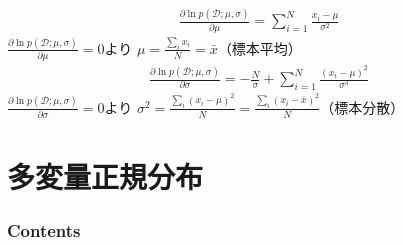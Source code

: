 \documentclass[aspectratio=169,unicode,dvipdfmx,14pt]{beamer}
\begin{document}
\begin{frame}
\begin{align}
\frac{\partial \ln p(\mathcal{D};\mu,\sigma)}{\partial \mu}
= \sum_{i=1}^N \frac{x_i - \mu}{\sigma^2}
\end{align}
$\frac{\partial \ln p(\mathcal{D};\mu,\sigma)}{\partial \mu}=0$より
$\mu = \frac{\sum_i x_i}{N} = \bar{x}$（標本平均）
\begin{align}
\frac{\partial \ln p(\mathcal{D};\mu,\sigma)}{\partial \sigma}
= - \frac{N}{\sigma} + \sum_{i=1}^N \frac{(x_i - \mu)^2}{\sigma^3}
\end{align}
$\frac{\partial \ln p(\mathcal{D};\mu,\sigma)}{\partial \sigma} = 0$より
$\sigma^2 = \frac{\sum_i (x_i - \mu)^2}{N} = \frac{\sum_i (x_i - \bar{x})^2}{N}$（標本分散）
\end{frame}


\section{多変量正規分布}

\begin{frame}\frametitle{Contents}
\Large \tableofcontents[currentsection]
\end{frame}
\end{document}
